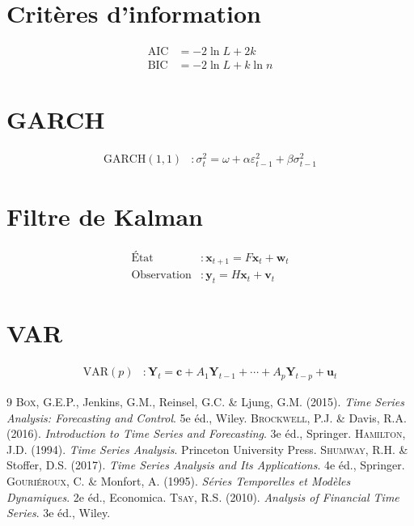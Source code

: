 \documentclass[12pt,a4paper,twoside]{book}
\theoremstyle{definition}
\theoremstyle{plain}
\theoremstyle{remark}
\newcommand{\eps}{\varepsilon}
\DeclareMathOperator{\AIC}{AIC}
\DeclareMathOperator{\BIC}{BIC}
\begin{document}
\section{Crit\`eres d'information}
\begin{align}
\AIC &= -2\ln L + 2k \\
\BIC &= -2\ln L + k\ln n
\end{align}

\section{GARCH}
\begin{align}
\text{GARCH}(1,1) &: \sigma_t^2 = \omega + \alpha\eps_{t-1}^2 + \beta\sigma_{t-1}^2
\end{align}

\section{Filtre de Kalman}
\begin{align}
\text{\'Etat} &: \bm{x}_{t+1} = F\bm{x}_t + \bm{w}_t \\
\text{Observation} &: \bm{y}_t = H\bm{x}_t + \bm{v}_t
\end{align}

\section{VAR}
\begin{align}
\text{VAR}(p) &: \bm{Y}_t = \bm{c} + A_1\bm{Y}_{t-1}+\cdots+A_p\bm{Y}_{t-p}+\bm{u}_t
\end{align}

\begin{thebibliography}{9}
 \textsc{Box}, G.E.P., Jenkins, G.M., Reinsel, G.C. \& Ljung, G.M. (2015). \emph{Time Series Analysis: Forecasting and Control}. 5e \'ed., Wiley.
 \textsc{Brockwell}, P.J. \& Davis, R.A. (2016). \emph{Introduction to Time Series and Forecasting}. 3e \'ed., Springer.
 \textsc{Hamilton}, J.D. (1994). \emph{Time Series Analysis}. Princeton University Press.
 \textsc{Shumway}, R.H. \& Stoffer, D.S. (2017). \emph{Time Series Analysis and Its Applications}. 4e \'ed., Springer.
 \textsc{Gouri\'eroux}, C. \& Monfort, A. (1995). \emph{S\'eries Temporelles et Mod\`eles Dynamiques}. 2e \'ed., Economica.
 \textsc{Tsay}, R.S. (2010). \emph{Analysis of Financial Time Series}. 3e \'ed., Wiley.
\end{thebibliography}

\printindex
\end{document}
